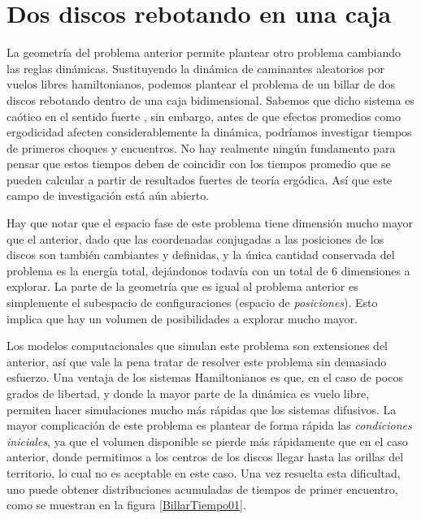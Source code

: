 \documentclass[letterpaper, 11pt]{article}
\begin{document}
\section{Dos discos rebotando en una caja}

La geometría del problema anterior permite plantear otro problema
cambiando las reglas dinámicas. Sustituyendo la dinámica de caminantes
aleatorios por vuelos libres hamiltonianos, podemos plantear el problema
de un billar de dos discos rebotando dentro de una caja  bidimensional.
Sabemos que dicho sistema es caótico en el sentido fuerte \cite{Sinai70},
sin embargo, 
antes de que efectos promedios como ergodicidad afecten considerablemente
la dinámica, podríamos investigar tiempos de primeros choques y encuentros.
No hay realmente ningún fundamento para pensar que estos tiempos
deben de coincidir con los tiempos promedio que se pueden calcular a partir
de resultados fuertes de teoría ergódica. 
Así que este campo de investigación está aún abierto.

Hay que notar que el espacio fase de este problema tiene dimensión mucho mayor
que el anterior, dado que las coordenadas conjugadas a las posiciones
de los discos son también cambiantes y definidas, 
y la única cantidad conservada del
problema es la energía total, dejándonos todavía con un total de 6 dimensiones
a explorar. La parte de la geometría que es igual al problema anterior
es simplemente el subespacio de configuraciones (espacio de \emph{posiciones}).
Esto implica que hay un volumen de posibilidades a explorar mucho mayor.

Los modelos computacionales que simulan este problema son extensiones del anterior,
así que vale la pena tratar de resolver este problema sin
demasiado esfuerzo. Una ventaja de los
sistemas Hamiltonianos es que, en el caso de pocos grados de libertad,
y donde la mayor parte de la dinámica es vuelo libre, permiten hacer 
simulaciones mucho más rápidas que los sistemas difusivos. La mayor complicación
de este problema es plantear de forma rápida las \emph{condiciones iniciales},
ya que el volumen disponible se pierde más rápidamente que en el caso anterior,
donde permitimos a los centros de los discos llegar hasta las orillas del
territorio, lo cual no es aceptable en este caso. 
Una vez resuelta esta 
dificultad, uno puede obtener distribuciones acumuladas de tiempos
de primer encuentro, como se muestran en la figura \ref{BillarTiempo01}.
\end{document}
